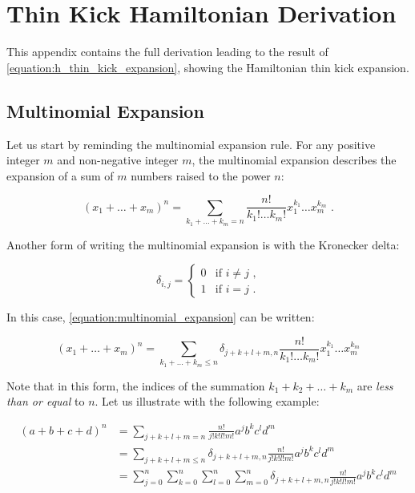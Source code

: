 \chapter{Thin Kick Hamiltonian Derivation}
\label{appendix:hamiltonian_derivation}

This appendix contains the full derivation leading to the result of \cref{equation:h_thin_kick_expansion}, showing the Hamiltonian thin kick expansion.

\section{Multinomial Expansion}
\label{section:multinomial_expansion}

Let us start by reminding the multinomial expansion rule.
For any positive integer \(m\) and non-negative integer \(m\), the multinomial expansion describes the expansion of a sum of \(m\) numbers raised to the power \(n\):

\begin{equation}
    (x_1 + \ldots + x_m)^n = \sum_{k_1 + \ldots + k_m = n} \frac{n!}{k_1! \ldots k_m!} x_1^{k_1} \ldots x_m^{k_m} \text{ .}
    \label{equation:multinomial_expansion}
\end{equation}

Another form of writing the multinomial expansion is with the Kronecker delta:

\begin{equation}
    \delta_{i,j} = 
        \begin{cases} 
            0 & \text{if } i \neq j \text{ ,} \\
            1 & \text{if } i = j \text{ .}
        \end{cases}
    \label{equation:kronecker_delta}
\end{equation}

In this case, \cref{equation:multinomial_expansion} can be written:

\begin{equation}
    (x_1 + \ldots + x_m)^n = \sum_{k_1 + \ldots + k_m \leq n} \delta_{j + k + l + m, n} \frac{n!}{k_1! \ldots k_m!} x_1^{k_1} \ldots x_m^{k_m}
    \label{equation:multinomial_expansion_kronecker}
\end{equation}

Note that in this form, the indices of the summation \(k_1 + k_2 + \ldots + k_m\) are \emph{less than or equal} to \(n\).
Let us illustrate with the following example:

\begin{equation}
    \begin{aligned}
    (a + b + c + d)^n &= \sum_{j + k + l + m = n}  \frac{n!}{j! k! l! m!} a^j b^k c^l d^m  \\
                      &= \sum_{j + k + l + m \leq n} \delta_{j + k + l + m, n} \frac{n!}{j! k! l! m!} a^j b^k c^l d^m  \\
                      &= \sum^n_{j=0} \sum^n_{k=0} \sum^n_{l=0} \sum^n_{m=0} \delta_{j + k + l + m, n} \frac{n!}{j! k! l! m!} a^j b^k c^l d^m
    \end{aligned}
\end{equation}

